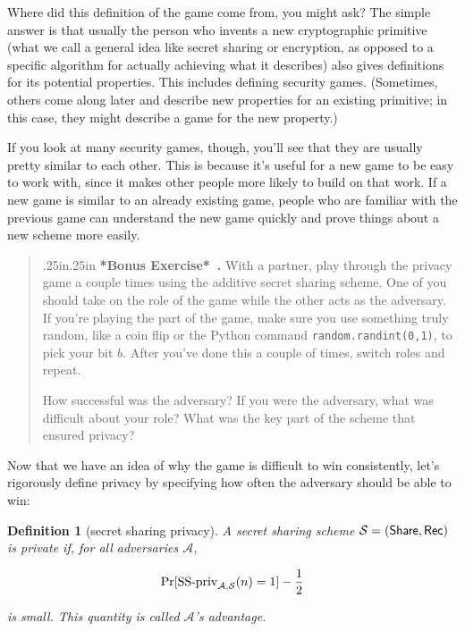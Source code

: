 \documentclass[12 pt]{article}
\newtheorem{definition}{Definition}
\def\A{\ensuremath{\mathcal{A}}}
\def\ss{\ensuremath{\mathcal{S}}}
\newcounter{exercise}[section]
\newenvironment{bonus}{\refstepcounter{exercise}\par\bigskip \begin{quotation}{}{\leftmargin .25in\rightmargin .25in}
    \noindent \textbf{*Bonus Exercise*~\thesection.\theexercise }  \rmfamily}{\end{quotation}\par\bigskip}
\newcounter{example}[section]
\begin{document}
Where did this definition of the game come from, you might ask? The simple 
answer is that usually the person who invents a new cryptographic 
primitive (what we call a general idea like secret sharing or 
encryption, as opposed to a specific algorithm for actually achieving 
what it describes) also gives definitions for its potential properties. 
This includes defining security games. (Sometimes, others come along 
later and describe new properties for an existing primitive; in this 
case, they might describe a game for the new property.) 

If you look at many security games, though, you'll see that they are 
usually pretty similar to each other. This is because it's useful for a 
new game to be easy to work with, since it makes other people more likely 
to build on that work. If a new game is similar to an already existing game, 
people who are familiar with the previous game can understand the new game 
quickly and prove things about a new scheme more easily.

\begin{bonus}
    With a partner, play through the privacy game a couple times using the 
    additive secret sharing scheme. One of you should take on the role of the 
    game while the other acts as the adversary. If you're playing the part 
    of the game, make sure you use something truly random, like a coin 
    flip or the Python command \texttt{random.randint(0,1)}\footnotemark,
    to pick your bit $b$.
    After you've done this a couple of times, switch roles and repeat.

    How successful was the adversary? If you were the adversary, what was 
    difficult about your role? What was the key part of the scheme that 
    ensured privacy?
\end{bonus}

Now that we have an idea of why the game is difficult to win consistently, 
let's rigorously define privacy by specifying how often the adversary should 
be able to win: 

\begin{definition}[secret sharing privacy]
    A secret sharing scheme $\ss = (\share,\allowbreak \rec)$ is \emph{private} if,
    for all 
    adversaries \A,

    \[
        \Pr[\textnormal{SS-priv}_{\A,\ss}(n) = 1] - \frac{1}{2}
    \]

    is small\footnotemark. This quantity is called $\A$'s \emph{advantage}.
\end{definition}
\end{document}

